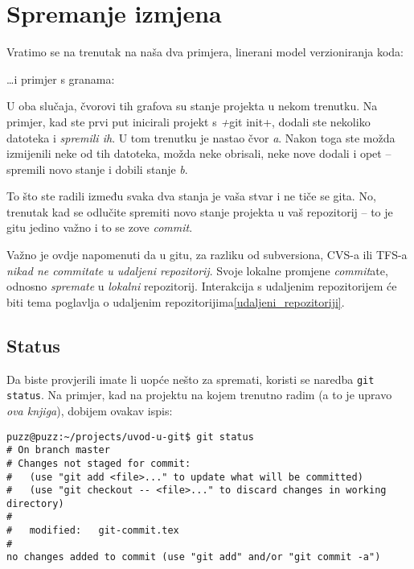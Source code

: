 \chapter*{Spremanje izmjena}

Vratimo se na trenutak na naša dva primjera, linerani model verzioniranja koda:



\dots{}i primjer s granama:



U oba slučaja, čvorovi tih grafova su stanje projekta u nekom trenutku.
Na primjer, kad ste prvi put inicirali projekt s \emph+git init+, dodali ste nekoliko datoteka i \emph{spremili ih}. 
U tom trenutku je nastao čvor \emph a.
Nakon toga ste možda izmijenili neke od tih datoteka, možda neke obrisali, neke nove dodali i opet -- spremili novo stanje i dobili stanje \emph b.

To što ste radili između svaka dva stanja je vaša stvar i ne tiče se gita.
No, trenutak kad se odlučite spremiti novo stanje projekta u vaš repozitorij -- to je gitu jedino važno i to se zove \emph{commit}.

Važno je ovdje napomenuti da u gitu, za razliku od subversiona, CVS-a ili TFS-a \emph{nikad ne commitate u udaljeni repozitorij}. 
Svoje lokalne promjene \emph{commit}ate, odnosno \emph{spremate} u \emph{lokalni} repozitorij.
Interakcija s udaljenim repozitorijem će biti tema poglavlja o udaljenim repozitorijima\ref{udaljeni_repozitoriji}.

\section*{Status}

Da biste provjerili imate li uopće nešto za spremati, koristi se naredba \verb+git status+.
Na primjer, kad na projektu na kojem trenutno radim (a to je upravo \emph{ova knjiga}), dobijem ovakav ispis:

\begin{verbatim}
puzz@puzz:~/projects/uvod-u-git$ git status
# On branch master
# Changes not staged for commit:
#   (use "git add <file>..." to update what will be committed)
#   (use "git checkout -- <file>..." to discard changes in working directory)
#
#	modified:   git-commit.tex
#
no changes added to commit (use "git add" and/or "git commit -a")
\end{verbatim}

